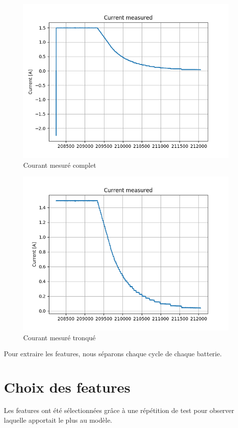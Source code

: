 \begin{figure}[H]
    \centering
    \includegraphics[scale=0.5]{images/currentmeas.png}
    \caption{Courant mesuré complet}
    \label{fig:courFull}
\end{figure}

\begin{figure}[H]
    \centering
    \includegraphics[scale=0.5]{images/currentmeasfilt.png}
    \caption{Courant mesuré tronqué}
    \label{fig:courTron}
\end{figure}

Pour extraire les features, nous séparons chaque cycle de chaque batterie. 

\section{Choix des features}
Les features ont été sélectionnées grâce à une répétition de test pour observer laquelle
apportait le plus au modèle.

